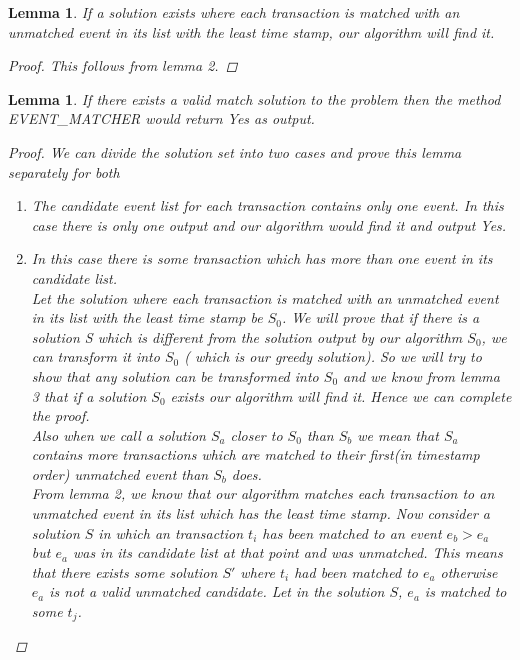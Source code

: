 \documentclass[12pt]{article}
\newcommand*\Let[2]{\State #1 $\gets$ #2}
\newtheorem{lemma}[theorem]{Lemma}
\begin{document}
\begin{lemma}
If a solution exists where each transaction is matched with an unmatched event in its list with the least time stamp, our algorithm will find it. 
\begin{proof}
This follows from lemma 2.
\end{proof}
\end{lemma}

\begin{lemma} If there exists a valid match solution to the problem then the method EVENT\_MATCHER would return Yes as output.
\begin{proof} 
We can divide the solution set into two cases and prove this lemma separately for both
\begin{enumerate}
\item The candidate event list for each transaction contains only one event. In this case there is only one output and our algorithm would find it and output Yes.

\item In this case there is some transaction which has more than one event in its candidate list. \\Let the solution where each transaction is matched with an unmatched event in its list with the least time stamp be $S_0$. 
We will prove that if there is a solution S which is different from the solution output by our algorithm $S_0$, we can transform it into $S_0$ ( which is our greedy solution). So we will try to show that any solution can be transformed into $S_0$ and we know from lemma 3 that if a solution $S_0$ exists our algorithm will find it. Hence we can complete the proof.
\\Also when we call a solution $S_a$ closer to $S_0$ than $S_b$ we mean that $S_a$ contains more transactions which are matched to their first(in timestamp order) unmatched event than $S_b$ does.\\

From lemma 2, we know that our algorithm matches each transaction to an unmatched event in its list which has the least time stamp. Now consider a solution $S$ in which an transaction $t_i$ has been matched to an event $e_b > e_a$ but $e_a$ was in its candidate list at that point and was unmatched. This means that there exists some solution $S'$ where $t_i$ had been matched to $e_a$ otherwise $e_a$ is not a valid unmatched candidate. Let in the solution $S$, $e_a$ is matched to some $t_j$. \\


\end{enumerate}
\end{proof}
\end{lemma}
\end{document}

